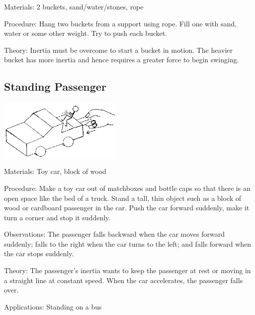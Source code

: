 \begin{multicols}{2}
\begin{description*}
\item[Materials:]{2 buckets, sand/water/stones, rope}
\item[Procedure:]{Hang two buckets from a support using rope. Fill one with sand, water or some other weight. Try to push each bucket.}
\item[Theory:]{Inertia must be overcome to start a bucket in motion. The heavier bucket has more inertia and hence requires a greater force to begin swinging.}
\end{description*}

\subsection{Standing Passenger}

\begin{center}
\includegraphics[width=0.45\textwidth]{./img/source/passenger.png}
\end{center}

\begin{description*}
\item[Materials:]{Toy car, block of wood}
\item[Procedure:]{Make a toy car out of matchboxes and bottle caps so that there is an open space like the bed of a truck. Stand a tall, thin object such as a block of wood or cardboard passenger in the car. Push the car forward suddenly, make it turn a corner and stop it suddenly.}
\item[Observations:]{The passenger falls backward when the car moves forward suddenly; falls to the right when the car turns to the left; and falls forward when the car stops suddenly.}
\item[Theory:]{The passenger's inertia wants to keep the passenger at rest or moving in a straight line at constant speed. When the car accelerates, the passenger falls over.}
\item[Applications:]{Standing on a bus}
\end{description*}


\end{multicols}
